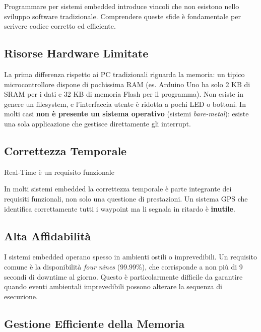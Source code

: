 \documentclass[
  italian,
  openany]{book}
\begin{document}
Programmare per sistemi embedded introduce vincoli che non esistono
nello sviluppo software tradizionale. Comprendere queste sfide è
fondamentale per scrivere codice corretto ed efficiente.

\subsection{Risorse Hardware Limitate}\label{risorse-hardware-limitate}

La prima differenza rispetto ai PC tradizionali riguarda la memoria: un
tipico microcontrollore dispone di pochissima RAM (es. Arduino Uno ha
solo 2 KB di SRAM per i dati e 32 KB di memoria Flash per il programma).
Non esiste in genere un filesystem, e l'interfaccia utente è ridotta a
pochi LED o bottoni. In molti casi \textbf{non è presente un sistema
operativo} (sistemi \emph{bare-metal}): esiste una sola applicazione che
gestisce direttamente gli interrupt.

\subsection{Correttezza Temporale}\label{correttezza-temporale}

\begin{calloutwarning}{Real-Time è un requisito funzionale}

In molti sistemi embedded la correttezza temporale è parte integrante
dei requisiti funzionali, non solo una questione di prestazioni. Un
sistema GPS che identifica correttamente tutti i waypoint ma li segnala
in ritardo è \textbf{inutile}.

\end{calloutwarning}

\subsection{Alta Affidabilità}\label{alta-affidabilituxe0}

I sistemi embedded operano spesso in ambienti ostili o imprevedibili. Un
requisito comune è la disponibilità \emph{four nines} (99.99\%), che
corrisponde a non più di 9 secondi di downtime al giorno. Questo è
particolarmente difficile da garantire quando eventi ambientali
imprevedibili possono alterare la sequenza di esecuzione.

\subsection{Gestione Efficiente della
Memoria}\label{gestione-efficiente-della-memoria}
\end{document}
